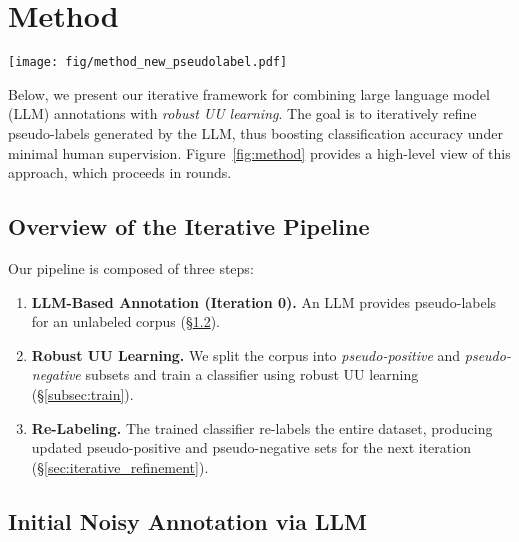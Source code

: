 \section{Method}
\begin{figure*}
    \centering
    \texttt{[image: fig/method\_new\_pseudolabel.pdf]}
    \caption{Overview of our iterative refinement pipeline. First, an LLM annotator generates initial pseudo-labels for an unlabeled corpus, dividing it into pseudo-positive and pseudo-negative corpora. Next, we train a classifier using robust UU learning on these pseudo corpora, yielding a model that outperforms the initial LLM annotations. Finally, the classifier re-labels the entire dataset, updating the pseudo-labels for the next iteration. Repeating this cycle gradually refines the pseudo-labels, leading to increasingly reliable labels.}\label{fig:method}
\end{figure*}

\label{sec:method}
Below, we present our iterative framework for combining large language model (LLM) annotations with \emph{robust UU learning}. The goal is to iteratively refine pseudo-labels generated by the LLM, thus boosting classification accuracy under minimal human supervision. Figure~\ref{fig:method} provides a high-level view of this approach, which proceeds in rounds.

\subsection{Overview of the Iterative Pipeline}
\label{subsec:method_overview}
Our pipeline is composed of three steps:
\begin{enumerate}
\item \textbf{LLM-Based Annotation (Iteration 0).} An LLM provides pseudo-labels for an unlabeled corpus (\S\ref{subsec:initial_llm}).  
\item \textbf{Robust UU Learning.} We split the corpus into \emph{pseudo-positive} and \emph{pseudo-negative} subsets and train a classifier using robust UU learning (\S\ref{subsec:train}).  
\item \textbf{Re-Labeling.} The trained classifier re-labels the entire dataset, producing updated pseudo-positive and pseudo-negative sets for the next iteration (\S\ref{sec:iterative_refinement}).  
\end{enumerate}

\subsection{Initial Noisy Annotation via LLM}
\label{subsec:initial_llm}

